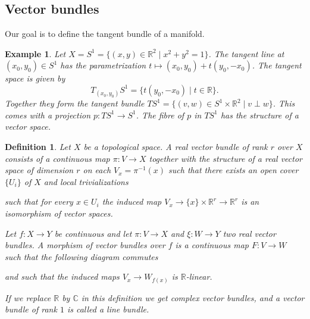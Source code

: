 \documentclass[12pt]{article}
\theoremstyle{darkgreentheorem}
\theoremstyle{darkbluedefinition}
\newtheorem{defn}[thm]{Definition}
\theoremstyle{darkredexample}
\newtheorem{exa}[thm]{Example}
\theoremstyle{remark}
\newcommand{\R}{\mathbb{R}}
\newcommand{\1}{\mathbbm{1}}
\newcommand{\C}{\mathbb{C}}
\begin{document}
\subsection{Vector bundles}

Our goal is to define the tangent bundle of a manifold.

\begin{exa}
    Let $X=S^{1}=\{(x,y)\in \R^{2}\mid x^{2}+y^{2}=1\}$.
    The tangent line at $(x_{0},y_{0})\in S^{1}$ has the parametrization $t\mapsto (x_{0},y_{0})+t(y_{0},-x_{0})$.
    The tangent space is given by
    \[ T_{(x_{0},y_{0})}S^{1}=\{ t(y_{0},-x_{0})\mid t\in \R\}.\]
    Together they form the tangent bundle $TS^{1}=\{(v,w)\in S^{1}\times \R^{2}\mid v\perp w\}$.
    This comes with a projection $p\colon TS^{1}\to S^{1}$.
    The fibre of $p$ in $TS^{1}$ has the structure of a vector space.
\end{exa}

\begin{defn}
    Let $X$ be a topological space.
    A \textit{real vector bundle} of rank $r$ over $X$ consists of a continuous map $\pi\colon V\to X$ together with the structure of a real vector space of dimension $r$ on each $V_{x}=\pi^{-1}(x)$ such that there exists an open cover $\{U_{i}\}$ of $X$ and local trivializations
    \begin{center}
    \end{center}
    such that for every $x\in U_{i}$ the induced map $V_{x}\to \{x\}\times \R^{r}\to \R^{r}$ is an isomorphism of vector spaces.

    Let $f\colon X\to Y$ be continuous and let $\pi\colon V\to X$ and $\xi\colon W\to Y$ two real vector bundles.
    A morphism of vector bundles over $f$ is a continuous map $F\colon V\to W$ such that the following diagram commutes
    \begin{center}
    \end{center}
    and such that the induced maps $V_{x}\to W_{f(x)}$ is $\R$-linear.
    
    If we replace $\R$ by $\C$ in this definition we get \textit{complex vector bundles}, and a vector bundle of rank $1$ is called a \textit{line bundle}.
\end{defn}
\end{document}
